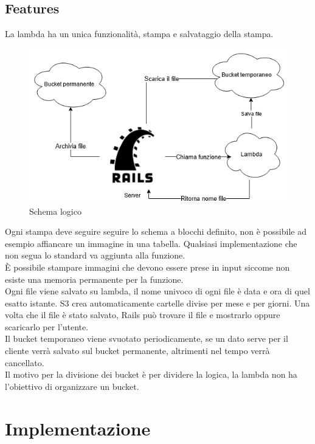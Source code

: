 \documentclass[12pt]{article}
\begin{document}
\subsection{Features}
La lambda ha un unica funzionalità, stampa e salvataggio della stampa.
\begin{figure}[H]
\includegraphics[scale = 0.6]{useCases.png}
\caption{Schema logico}
\end{figure}
Ogni stampa deve seguire seguire lo schema a blocchi definito, non è possibile 
ad esempio affiancare un immagine in una tabella. 
Qualsiasi implementazione che non segua lo standard va aggiunta alla funzione.
\\ È possibile stampare immagini che devono essere prese in input siccome non 
esiste una memoria permanente per la funzione.
\\ Ogni file viene salvato su lambda, il nome univoco di ogni file è 
data e ora di quel esatto istante. 
S3 crea automaticamente cartelle divise per mese e per giorni. 
Una volta che il file è stato salvato, Rails può trovare il file e mostrarlo 
oppure scaricarlo per l'utente.
\\ Il bucket temporaneo viene svuotato periodicamente, se un dato serve per il 
cliente verrà salvato sul bucket permanente, 
altrimenti nel tempo verrà cancellato.
\\ Il motivo per la divisione dei bucket è per dividere la logica, 
la lambda non ha l'obiettivo di organizzare un bucket.



\section{Implementazione}
\end{document}
